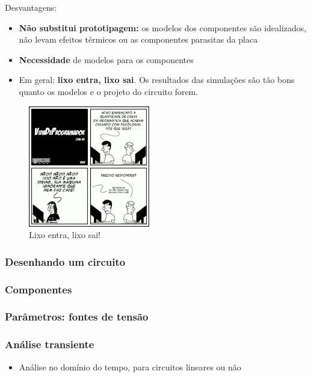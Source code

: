 \documentclass{beamer}
\begin{document}
\begin{frame}
Desvantagens:
\begin{itemize}
\item{\textbf{Não substitui prototipagem:} os modelos dos componentes são idealizados, não levam efeitos térmicos ou as componentes parasitas da placa}
\item{\textbf{Necessidade} de modelos para os componentes}

\item{Em geral: \textbf{lixo entra, lixo sai}. Os resultados das simulações são tão bons quanto os modelos e o projeto do circuito forem.}
\end{itemize}
\end{frame}

\begin{frame}

\begin{figure}[htb]
\includegraphics[width=200px]{images/tirinha33}
\caption{Lixo entra, lixo sai!}
\label{fig:lixoentrasai}
\end{figure}

\end{frame}

\begin{frame}
\frametitle{Desenhando um circuito}
\end{frame}

\begin{frame}
\frametitle{Componentes}
\end{frame}

\begin{frame}
\frametitle{Parâmetros: fontes de tensão}
\end{frame}

\begin{frame}
\frametitle{Análise transiente}
\begin{itemize}
\item{Análise no domínio do tempo, para circuitos lineares ou não}
\end{itemize}
\end{frame}
\end{document}
